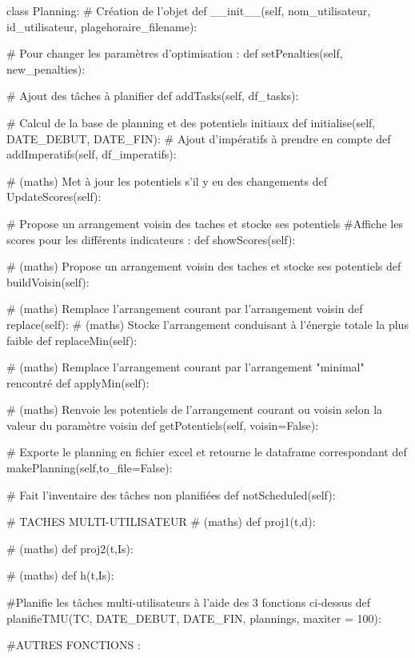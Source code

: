 \documentclass[12pt]{article}
\newenvironment{code}%
   {\snugshade\verbatim}%
   {\endverbatim\endsnugshade}
\begin{document}
\begin{code}
class Planning:
    # Création de l'objet
    def __init__(self, nom_utilisateur, id_utilisateur, plagehoraire_filename):
    
    # Pour changer les paramètres d'optimisation :
    def setPenalties(self, new_penalties):
    
    # Ajout des tâches à planifier
    def addTasks(self, df_tasks):
    
    # Calcul de la base de planning et des potentiels initiaux
    def initialise(self, DATE_DEBUT, DATE_FIN):
    # Ajout d'impératifs à prendre en compte
    def addImperatifs(self, df_imperatifs):
    
    # (maths) Met à jour les potentiels s'il y eu des changements
    def UpdateScores(self):
    
    # Propose un arrangement voisin des taches et stocke ses potentiels
    #Affiche les scores pour les différents indicateurs :
    def showScores(self):
    
    # (maths) Propose un arrangement voisin des taches et stocke ses potentiels
    def buildVoisin(self):
    
    # (maths) Remplace l'arrangement courant par l'arrangement voisin
    def replace(self):
    # (maths) Stocke l'arrangement conduisant à l'énergie totale la plus faible
    def replaceMin(self):
    
    # (maths) Remplace l'arrangement courant par l'arrangement "minimal" rencontré
    def applyMin(self):
    
     # (maths) Renvoie les potentiels de l'arrangement courant ou voisin selon la valeur du paramètre voisin
    def getPotentiels(self, voisin=False):
    
    # Exporte le planning en fichier excel et retourne le dataframe correspondant
    def makePlanning(self,to_file=False):
    
    # Fait l'inventaire des tâches non planifiées
    def notScheduled(self):
    
    
    
# TACHES MULTI-UTILISATEUR
# (maths)
def proj1(t,d):

# (maths)
def proj2(t,Is):

# (maths)
def h(t,Is):

#Planifie les tâches multi-utilisateurs à l'aide des 3 fonctions ci-dessus
def planifieTMU(TC,  DATE_DEBUT, DATE_FIN, plannings, maxiter = 100):


#AUTRES FONCTIONS :


\end{code}
\end{document}

